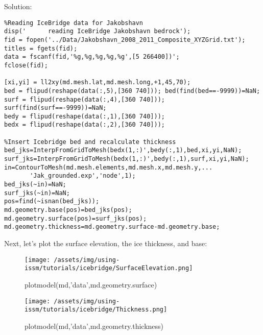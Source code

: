 Solution:
\begin{verbatim}%Reading IceBridge data for Jakobshavn
disp('      reading IceBridge Jakobshavn bedrock');
fid = fopen('../Data/Jakobshavn_2008_2011_Composite_XYZGrid.txt');
titles = fgets(fid); 
data = fscanf(fid,'%g,%g,%g,%g,%g',[5 266400])';
fclose(fid);

[xi,yi] = ll2xy(md.mesh.lat,md.mesh.long,+1,45,70);
bed = flipud(reshape(data(:,5),[360 740])); bed(find(bed==-9999))=NaN;
surf = flipud(reshape(data(:,4),[360 740])); surf(find(surf==-9999))=NaN;
bedy = flipud(reshape(data(:,1),[360 740]));
bedx = flipud(reshape(data(:,2),[360 740]));

%Insert Icebridge bed and recalculate thickness
bed_jks=InterpFromGridToMesh(bedx(1,:)',bedy(:,1),bed,xi,yi,NaN);
surf_jks=InterpFromGridToMesh(bedx(1,:)',bedy(:,1),surf,xi,yi,NaN);
in=ContourToMesh(md.mesh.elements,md.mesh.x,md.mesh.y,...
	   'Jak_grounded.exp','node',1);
bed_jks(~in)=NaN;
surf_jks(~in)=NaN;
pos=find(~isnan(bed_jks));
md.geometry.base(pos)=bed_jks(pos);
md.geometry.surface(pos)=surf_jks(pos);
md.geometry.thickness=md.geometry.surface-md.geometry.base;\end{verbatim}

Next, let's plot the surface elevation, the ice thickness, and base:
\begin{figure}[H]
	\begin{center}
	\texttt{[image: /assets/img/using-issm/tutorials/icebridge/SurfaceElevation.png]}
	\caption{plotmodel(md,'data',md.geometry.surface)}
	\end{center}
\end{figure}

\begin{figure}[H]
	\begin{center}
	\texttt{[image: /assets/img/using-issm/tutorials/icebridge/Thickness.png]}
	\caption{plotmodel(md,'data',md.geometry.thickness)}
	\end{center}
\end{figure}

